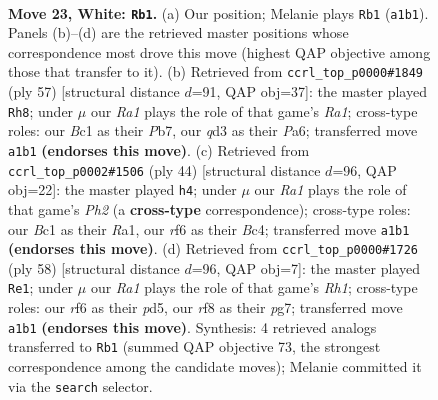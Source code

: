 \documentclass[11pt]{article}
\begin{document}
\clearpage

\begin{figure}[p]\centering
\begin{subfigure}{0.46\textwidth}\centering
\resizebox{\linewidth}{!}{%
\newchessgame
\chessboard[
  setfen={5r2/1bp2pk1/5rp1/pB2Q2p/2P4P/3q4/PP1N2P1/R1B3K1 w - - 3 23},
  showmover=false,
  pgfstyle=straightmove, color=movearrow, markmove={a1-b1}
]}
\caption{}
\end{subfigure}\hfill
\begin{subfigure}{0.46\textwidth}\centering
\resizebox{\linewidth}{!}{%
\newchessgame
\chessboard[
  setfen={r7/1pb2k2/p3b2q/3p1p2/B2R1n1P/4QP2/PPP5/1K2R3 b - - 3 29},
  showmover=false,
  pgfstyle=straightmove, color=movearrow, markmove={a8-h8}
]}
\caption{}
\end{subfigure}
\\[4pt]
\begin{subfigure}{0.46\textwidth}\centering
\resizebox{\linewidth}{!}{%
\newchessgame
\chessboard[
  setfen={5rk1/1b3ppp/3p4/1PqPp1b1/1pB5/3P4/1B2QPPP/R5K1 w - - 3 23},
  showmover=false,
  pgfstyle=straightmove, color=movearrow, markmove={h2-h4}
]}
\caption{}
\end{subfigure}\hfill
\begin{subfigure}{0.46\textwidth}\centering
\resizebox{\linewidth}{!}{%
\newchessgame
\chessboard[
  setfen={r3r1k1/5ppp/2p5/2qpp1P1/8/1B3P2/P1PQ3P/1NK4R w - - 5 30},
  showmover=false,
  pgfstyle=straightmove, color=movearrow, markmove={h1-e1}
]}
\caption{}
\end{subfigure}
\caption{\textbf{Move 23, White: \texttt{Rb1}.} (a) Our position; Melanie plays \texttt{Rb1} (\texttt{a1b1}). Panels (b)--(d) are the retrieved master positions whose correspondence most drove this move (highest QAP objective among those that transfer to it). (b) Retrieved from \texttt{ccrl\_top\_p0000\#1849} (ply 57) [structural distance $d$=91, QAP obj=37]: the master played \texttt{Rh8}; under $\mu$ our \emph{Ra1} plays the role of that game's \emph{Ra1}; cross-type roles: our \emph{B}c1 as their \emph{P}b7, our \emph{q}d3 as their \emph{P}a6; transferred move \texttt{a1b1} \textbf{(endorses this move)}. (c) Retrieved from \texttt{ccrl\_top\_p0002\#1506} (ply 44) [structural distance $d$=96, QAP obj=22]: the master played \texttt{h4}; under $\mu$ our \emph{Ra1} plays the role of that game's \emph{Ph2} (a \textbf{cross-type} correspondence); cross-type roles: our \emph{B}c1 as their \emph{R}a1, our \emph{r}f6 as their \emph{B}c4; transferred move \texttt{a1b1} \textbf{(endorses this move)}. (d) Retrieved from \texttt{ccrl\_top\_p0000\#1726} (ply 58) [structural distance $d$=96, QAP obj=7]: the master played \texttt{Re1}; under $\mu$ our \emph{Ra1} plays the role of that game's \emph{Rh1}; cross-type roles: our \emph{r}f6 as their \emph{p}d5, our \emph{r}f8 as their \emph{p}g7; transferred move \texttt{a1b1} \textbf{(endorses this move)}. Synthesis: 4 retrieved analogs transferred to \texttt{Rb1} (summed QAP objective 73, the strongest correspondence among the candidate moves); Melanie committed it via the \texttt{search} selector.}
\label{fig:thought-m44}
\end{figure}
\end{document}
